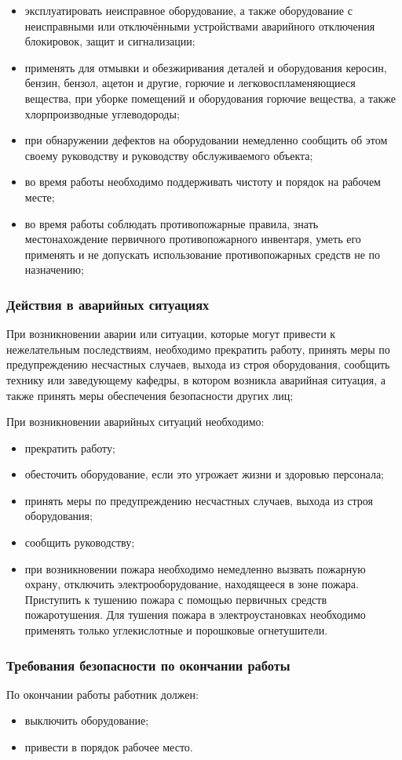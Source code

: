 \begin{itemize}
\item эксплуатировать неисправное оборудование, а также оборудование с неисправными или отключёнными устройствами аварийного отключения блокировок, защит и сигнализации;
\item применять для отмывки и обезжиривания деталей и оборудования керосин, бензин, бензол, ацетон и другие, горючие и легковоспламеняющиеся вещества, при уборке помещений и оборудования горючие вещества, а также хлорпроизводные углеводороды;
\end{itemize}
\begin{itemize}
\item при обнаружении дефектов на оборудовании немедленно сообщить об этом своему руководству и руководству обслуживаемого объекта;
\item во время работы необходимо поддерживать чистоту и порядок на рабочем месте;
\item во время работы соблюдать противопожарные правила, знать местонахождение первичного противопожарного инвентаря, уметь его применять и не допускать использование противопожарных средств не по назначению;
\end{itemize}
\subsubsection{Действия в аварийных ситуациях}

При возникновении аварии или ситуации, которые могут привести к нежелательным последствиям, необходимо прекратить работу, принять меры по предупреждению несчастных случаев, выхода из строя оборудования, сообщить технику или заведующему кафедры, в котором возникла аварийная ситуация, а также принять меры обеспечения безопасности других лиц;

При возникновении аварийных ситуаций необходимо:

\begin{itemize}
\item прекратить работу;
\item обесточить оборудование, если это угрожает жизни и здоровью персонала;
\item принять меры по предупреждению несчастных случаев, выхода из строя оборудования;
\item сообщить руководству;
\end{itemize}

\begin{itemize}
\item при возникновении пожара необходимо немедленно вызвать пожарную охрану, отключить электрооборудование, находящееся в зоне пожара. Приступить к тушению пожара с помощью первичных средств пожаротушения. Для тушения пожара в электроустановках необходимо применять только углекислотные и порошковые огнетушители.
\end{itemize}
\subsubsection{Требования безопасности по окончании работы}

По окончании работы работник должен:

\begin{itemize}
\item выключить оборудование;
\item привести в порядок рабочее место.
\end{itemize}